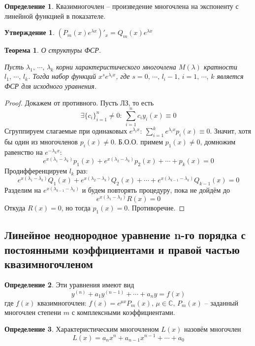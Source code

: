 \documentclass[a4paper,12pt]{article}
\theoremstyle{plain}
\newtheorem{theorem}{Теорема}[section]
\newtheorem{proposition}{Утверждение}[section]
\theoremstyle{definition}
\newtheorem{definition}{Определение}[section]
\theoremstyle{remark}
\begin{document}
\begin{definition}
	Квазимногочлен -- произведение многочлена на экспоненту с линейной функцией в показателе.
\end{definition}

\begin{proposition}
	$(P_m(x)e^{\lambda x})'_x = Q_m(x)e^{\lambda x}$
\end{proposition}

\begin{theorem}
	О структуры ФСР.

	Пусть $\lambda_1,\,\cdots,\, \lambda_k$ корни характеристического многочлена $M(\lambda)$ кратности $l_1,\,\cdots,\,l_k$. Тогда набор функций $x^se^{\lambda_i x}$, где $s = 0,\,\cdots,\,l_i - 1,\, i = 1,\,\cdots,\,k$ является ФСР для исходного уравнения.
\end{theorem}

\begin{proof}
	Докажем от противного. Пусть ЛЗ, то есть
	\[\exists \{c_i\}_{i = 1}^n \neq 0:\: \sum_{i = 1}^n c_iy_i(x) \equiv 0\]
	Сгруппируем слагаемые при одинаковых $e^{\lambda_i x}:\: \sum\limits_{i = 1}^k e^{\lambda_i x}p_i(x) \equiv 0$. Значит, хотя бы один из многочленов $p_i(x) \neq 0$. Б.О.О. примем $p_1(x) \neq 0$, домножим равенство на $e^{-\lambda_k x}$:
	\[e^{x(\lambda_1 - \lambda_k)}p_1(x) + e^{x(\lambda_2 - \lambda_k)}p_2(x) + \cdots + p_k(x) = 0\]
	Продифференцируем $l_k$ раз:
	\[e^{x(\lambda_1 - \lambda_k)}Q_1(x) + e^{x(\lambda_2 - \lambda_k)}Q_2(x) + \cdots + e^{x(\lambda_{k-1} - \lambda_k)}Q_{k-1}(x) = 0\]
	Разделим на $e^{x(\lambda_{k-1} - \lambda_k)}$ и будем повторять процедуру, пока не дойдём до
	\[e^{x(\lambda_1 - \lambda_2)}R(x) = 0\]
	Откуда $R(x) = 0$, но тогда $p_1(x) = 0$. Противоречие.
\end{proof}

\subsection{Линейное неоднородное уравнение n-го порядка с постоянными коэффициентами и правой частью квазимногочленом}
\begin{definition}
	Эти уравнения имеют вид
	\[y^{(n)} + a_1y^{(n-1)} + \cdots + a_ny = f(x)\]
	где $f(x)$ квазимногочлен: $f(x) = e^{\mu x}P_m(x),\, \mu \in \mathbb{C},\, P_m(x)$ -- заданный многочлен степени $m$ с комплексными коэффициентами.
\end{definition}

\begin{definition}
	Характеристическим многочленом $L(x)$ назовём многочлен
	\[L(x) = a_nx^n + a_{n-1}x^{n-1} + \cdots + a_0\]
\end{definition}
\end{document}
